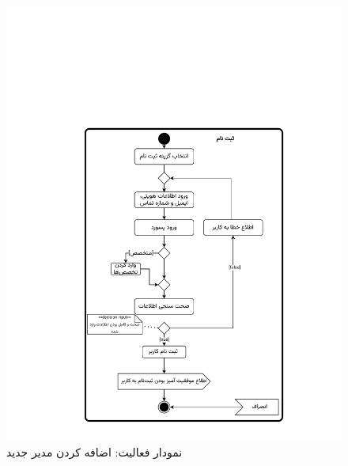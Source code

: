 \begin{figure}
	\centering
	\includegraphics[scale=0.8, page=7]{figs/OOD-activity1-10.pdf}
	\caption{نمودار فعالیت: اضافه کردن مدیر جدید}
\end{figure}
\FloatBarrier
\newpage

